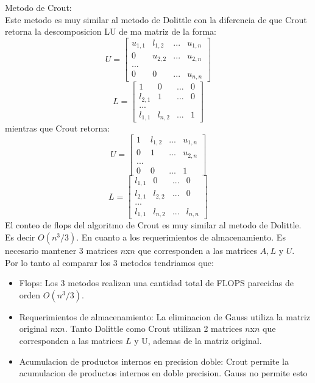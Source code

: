 \documentclass[12pt]{article}
\begin{document}
Metodo de Crout:\\
Este metodo es muy similar al metodo de Dolittle con la diferencia de que Crout retorna la descomposicion LU de ma matriz de la forma:
$$U=\begin{bmatrix}
    u_{1,1}&l_{1,2}&...&u_{1,n}\\
    0&u_{2,2}&...&u_{2,n}\\
    ...\\
    0&0&...&u_{n,n}
\end{bmatrix}$$
$$L=\begin{bmatrix}
    1&0&...&0\\
    l_{2,1}&1&...&0\\
    ...\\
    l_{1,1}&l_{n,2}&...&1
\end{bmatrix}$$
mientras que Crout retorna:
$$U=\begin{bmatrix}
    1&l_{1,2}&...&u_{1,n}\\
    0&1&...&u_{2,n}\\
    ...\\
    0&0&...&1
\end{bmatrix}$$
$$L=\begin{bmatrix}
    l_{1,1}&0&...&0\\
    l_{2,1}&l_{2,2}&...&0\\
    ...\\
    l_{1,1}&l_{n,2}&...&l_{n,n}
\end{bmatrix}$$
El conteo de flops del algoritmo de Crout es muy similar al metodo de Dolittle. Es decir $O(n^3/3)$.
En cuanto a los requerimientos de almacenamiento. Es necesario mantener 3 matrices $n$x$n$ que corresponden a las matrices $A,L$ y $U$.\\

Por lo tanto al comparar los 3 metodos tendriamos que:
\begin{itemize}
    \item Flops: Los 3 metodos realizan una cantidad total de FLOPS parecidas de orden $O(n^3/3)$.
    \item Requerimientos de almacenamiento: La eliminacion de Gauss utiliza la matriz original $n$x$n$. Tanto Dolittle como Crout utilizan 2 matrices $n$x$n$ que corresponden a las matrices $L$ y U, ademas de la matriz original.
    \item Acumulacion de productos internos en precision doble: Crout permite la acumulacion de productos internos en doble precision. Gauss no permite esto 
    
\end{itemize}
\end{document}
